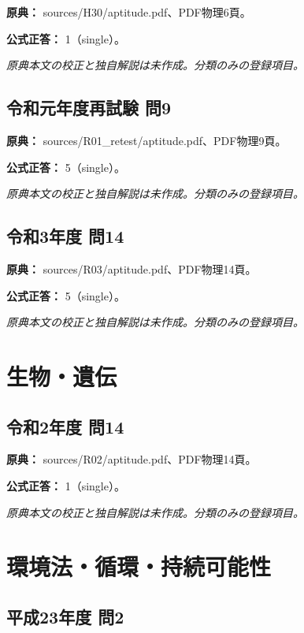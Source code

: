\noindent\textbf{原典：} sources/H30/aptitude.pdf、PDF物理6頁。

\textbf{公式正答：} 1（single）。

\par\textit{原典本文の校正と独自解説は未作成。分類のみの登録項目。}

\subsection{令和元年度再試験 問9}
\label{q:r01-ret-apt-09}

\noindent\textbf{原典：} sources/R01\_retest/aptitude.pdf、PDF物理9頁。

\textbf{公式正答：} 5（single）。

\par\textit{原典本文の校正と独自解説は未作成。分類のみの登録項目。}

\subsection{令和3年度 問14}
\label{q:r03-reg-apt-14}

\noindent\textbf{原典：} sources/R03/aptitude.pdf、PDF物理14頁。

\textbf{公式正答：} 5（single）。

\par\textit{原典本文の校正と独自解説は未作成。分類のみの登録項目。}

\section{生物・遺伝}

\subsection{令和2年度 問14}
\label{q:r02-reg-apt-14}

\noindent\textbf{原典：} sources/R02/aptitude.pdf、PDF物理14頁。

\textbf{公式正答：} 1（single）。

\par\textit{原典本文の校正と独自解説は未作成。分類のみの登録項目。}

\section{環境法・循環・持続可能性}

\subsection{平成23年度 問2}
\label{q:h23-reg-apt-02}

